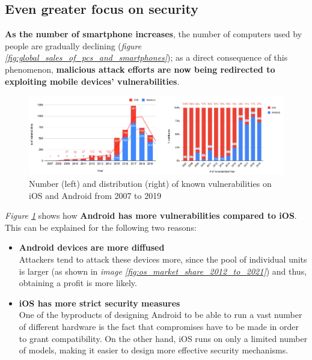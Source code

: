 \subsection{Even greater focus on security}
\textbf{As the number of smartphone increases}, the number of computers used by people are gradually declining (\textit{figure \ref{fig:global_sales_of_pcs_and_smartphones}}); as a direct consequence of this phenomenon, \textbf{malicious attack efforts are now being redirected to exploiting mobile devices' vulnerabilities}.
\begin{figure}[!ht]
    \centering
    \includegraphics[width=\linewidth]{document/chapters/chapter_3/images/mobile_vulnerabilities.jpg}
    \caption{Number (left) and distribution (right) of known vulnerabilities on iOS and Android from 2007 to 2019 \cite{mobile_security}}
    \label{fig:mobile_vulnerabilities}
\end{figure}
\textit{Figure \ref{fig:mobile_vulnerabilities}} shows how \textbf{Android has more vulnerabilities compared to iOS}. This can be explained for the following two reasons:
\begin{itemize}
    \item \textbf{Android devices are more diffused}\\
    Attackers tend to attack these devices more, since the pool of individual units is larger (as shown in \textit{image \ref{fig:os_market_share_2012_to_2021}}) and thus, obtaining a profit is more likely.
    \item \textbf{iOS has more strict security measures} \cite{mobile_security}\\
    One of the byproducts of designing Android to be able to run a vast number of different hardware is the fact that compromises have to be made in order to grant compatibility. On the other hand, iOS runs on only a limited number of models, making it easier to design more effective security mechanisms. 
\end{itemize}
